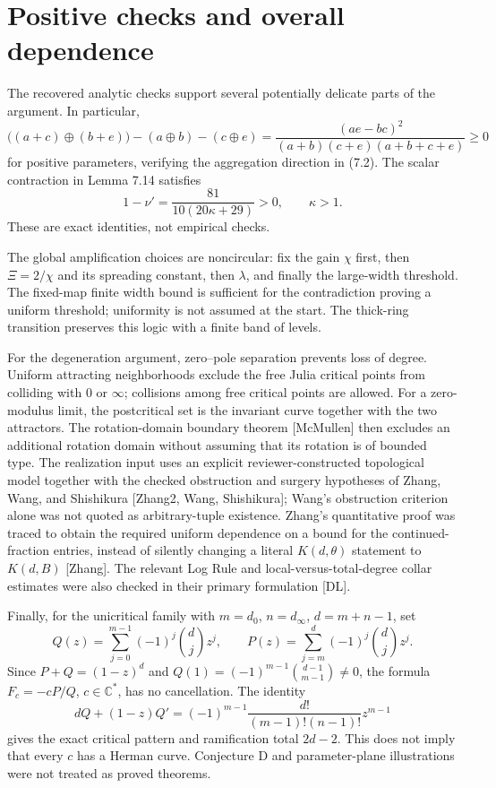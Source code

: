 \documentclass[10pt]{article}
\begin{document}
\section*{Positive checks and overall dependence}
The recovered analytic checks support several potentially delicate parts of the argument. In particular, \[\bigl((a+c)\oplus(b+e)\bigr)-(a\oplus b)-(c\oplus e)
 =\frac{(ae-bc)^2}{(a+b)(c+e)(a+b+c+e)}\geq0\] for positive parameters, verifying the aggregation direction in (7.2). The scalar contraction in Lemma 7.14 satisfies \[1-\nu'=\frac{81}{10(20\kappa+29)}>0,\qquad\kappa>1 .\] These are exact identities, not empirical checks.\par
The global amplification choices are noncircular: fix the gain \(\chi\) first, then \(\Xi=2/\chi\) and its spreading constant, then \(\lambda\), and finally the large-width threshold. The fixed-map finite width bound is sufficient for the contradiction proving a uniform threshold; uniformity is not assumed at the start. The thick-ring transition preserves this logic with a finite band of levels.\par
For the degeneration argument, zero–pole separation prevents loss of degree. Uniform attracting neighborhoods exclude the free Julia critical points from colliding with \(0\) or \(\infty\); collisions among free critical points are allowed. For a zero-modulus limit, the postcritical set is the invariant curve together with the two attractors. The rotation-domain boundary theorem [McMullen] then excludes an additional rotation domain without assuming that its rotation is of bounded type. The realization input uses an explicit reviewer-constructed topological model together with the checked obstruction and surgery hypotheses of Zhang, Wang, and Shishikura [Zhang2, Wang, Shishikura]; Wang’s obstruction criterion alone was not quoted as arbitrary-tuple existence. Zhang’s quantitative proof was traced to obtain the required uniform dependence on a bound for the continued-fraction entries, instead of silently changing a literal \(K(d,\theta)\) statement to \(K(d,B)\) [Zhang]. The relevant Log Rule and local-versus-total-degree collar estimates were also checked in their primary formulation [DL].\par
Finally, for the unicritical family with \(m=d_0\), \(n=d_\infty\), \(d=m+n-1\), set \[Q(z)=\sum_{j=0}^{m-1}(-1)^j{d\choose j}z^j,\qquad
 P(z)=\sum_{j=m}^{d}(-1)^j{d\choose j}z^j .\] Since \(P+Q=(1-z)^d\) and \(Q(1)=(-1)^{m-1}{d-1\choose m-1}\ne0\), the formula \(F_c=-cP/Q\), \(c\in\mathbb C^*\), has no cancellation. The identity \[dQ+(1-z)Q'=(-1)^{m-1}\frac{d!}{(m-1)!(n-1)!}z^{m-1}\] gives the exact critical pattern and ramification total \(2d-2\). This does not imply that every \(c\) has a Herman curve. Conjecture D and parameter-plane illustrations were not treated as proved theorems.\par
\end{document}
